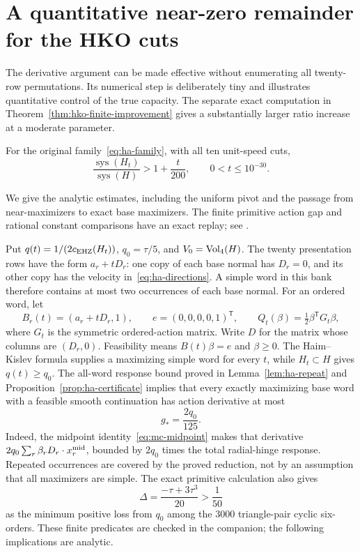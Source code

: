\section{A quantitative near-zero remainder for the HKO cuts}
\label{sec:hko-effective}

The derivative argument can be made effective without enumerating all
twenty-row permutations. Its numerical step is deliberately tiny and
illustrates quantitative control of the true capacity. The separate exact
computation in Theorem~\ref{thm:hko-finite-improvement} gives a substantially
larger ratio increase at a moderate parameter.

\begin{proposition}\label{prop:hko-effective}
For the original family~\eqref{eq:ha-family}, with all ten unit-speed cuts,
\[
 \frac{\operatorname{sys}(H_t)}{\operatorname{sys}(H)}
       >1+\frac{t}{200},\qquad 0<t\leq10^{-30}.
\]
\end{proposition}

We give the analytic estimates, including the uniform pivot and the passage
from near-maximizers to exact base maximizers. The finite primitive action
gap and rational constant comparisons have an exact replay; see
.

Put $q(t)=1/(2c_{\mathrm{EHZ}}(H_t))$, $q_0=\tau/5$, and
$V_0=\operatorname{Vol}_4(H)$. The twenty presentation rows have the form
$a_r+tD_r$: one copy of each base normal has $D_r=0$, and its other copy
has the velocity in~\eqref{eq:ha-directions}. A simple word in this bank
therefore contains at most two occurrences of each base normal. For an
ordered word, let
\[
 B_r(t)=(a_r+tD_r,1),\qquad e=(0,0,0,0,1)^{\mathsf T},
 \qquad Q_t(\beta)=\tfrac12\beta^{\mathsf T}G_t\beta,
\]
where $G_t$ is the symmetric ordered-action matrix. Write $D$ for the
matrix whose columns are $(D_r,0)$. Feasibility means
$B(t)\beta=e$ and $\beta\geq0$. The Haim--Kislev formula supplies a
maximizing simple word for every $t$, while $H_t\subset H$ gives
$q(t)\geq q_0$. The all-word response bound proved in
Lemma~\ref{lem:ha-repeat} and Proposition~\ref{prop:ha-certificate} implies
that every exactly maximizing base word with a feasible smooth
continuation has action derivative at most
\begin{equation}\label{eq:he-base-derivative}
 g_*=\frac{2q_0}{125}.
\end{equation}
Indeed, the midpoint identity~\eqref{eq:mc-midpoint} makes that derivative
$2q_0\sum_r\beta_rD_r\cdot x_r^{\rm mid}$, bounded by $2q_0$ times the
total radial-hinge response. Repeated occurrences are covered by the
proved reduction, not by an assumption that all maximizers are simple.
The exact primitive calculation also gives
\begin{equation}\label{eq:he-primitive-gap}
 \Delta=\frac{-\tau+3\tau^3}{20}>\frac1{50}
\end{equation}
as the minimum positive loss from $q_0$ among the $3000$ triangle-pair
cyclic six-orders. These finite predicates are checked in the companion;
the following implications are analytic.

